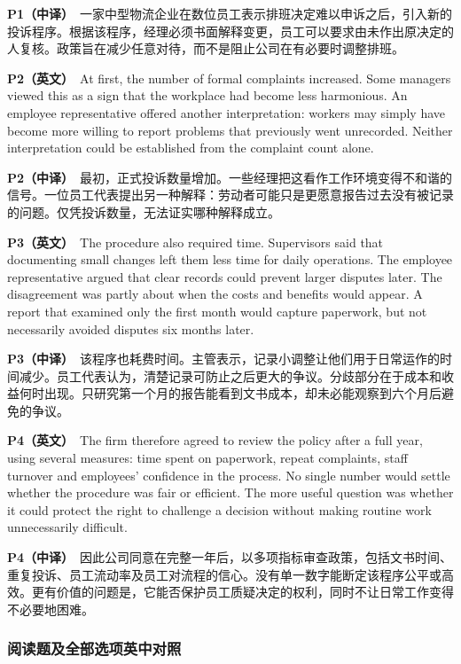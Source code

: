 \documentclass[
  11pt,
]{ctexart}
\begin{document}
\textbf{P1（中译）}　一家中型物流企业在数位员工表示排班决定难以申诉之后，引入新的投诉程序。根据该程序，经理必须书面解释变更，员工可以要求由未作出原决定的人复核。政策旨在减少任意对待，而不是阻止公司在有必要时调整排班。

\textbf{P2（英文）}　At first, the number of formal complaints
increased. Some managers viewed this as a sign that the workplace had
become less harmonious. An employee representative offered another
interpretation: workers may simply have become more willing to report
problems that previously went unrecorded. Neither interpretation could
be established from the complaint count alone.

\textbf{P2（中译）}　最初，正式投诉数量增加。一些经理把这看作工作环境变得不和谐的信号。一位员工代表提出另一种解释：劳动者可能只是更愿意报告过去没有被记录的问题。仅凭投诉数量，无法证实哪种解释成立。

\textbf{P3（英文）}　The procedure also required time. Supervisors said
that documenting small changes left them less time for daily operations.
The employee representative argued that clear records could prevent
larger disputes later. The disagreement was partly about when the costs
and benefits would appear. A report that examined only the first month
would capture paperwork, but not necessarily avoided disputes six months
later.

\textbf{P3（中译）}　该程序也耗费时间。主管表示，记录小调整让他们用于日常运作的时间减少。员工代表认为，清楚记录可防止之后更大的争议。分歧部分在于成本和收益何时出现。只研究第一个月的报告能看到文书成本，却未必能观察到六个月后避免的争议。

\textbf{P4（英文）}　The firm therefore agreed to review the policy
after a full year, using several measures: time spent on paperwork,
repeat complaints, staff turnover and employees' confidence in the
process. No single number would settle whether the procedure was fair or
efficient. The more useful question was whether it could protect the
right to challenge a decision without making routine work unnecessarily
difficult.

\textbf{P4（中译）}　因此公司同意在完整一年后，以多项指标审查政策，包括文书时间、重复投诉、员工流动率及员工对流程的信心。没有单一数字能断定该程序公平或高效。更有价值的问题是，它能否保护员工质疑决定的权利，同时不让日常工作变得不必要地困难。

\subsubsection{阅读题及全部选项英中对照}\label{ux9605ux8bfbux9898ux53caux5168ux90e8ux9009ux9879ux82f1ux4e2dux5bf9ux7167-1}
\end{document}
